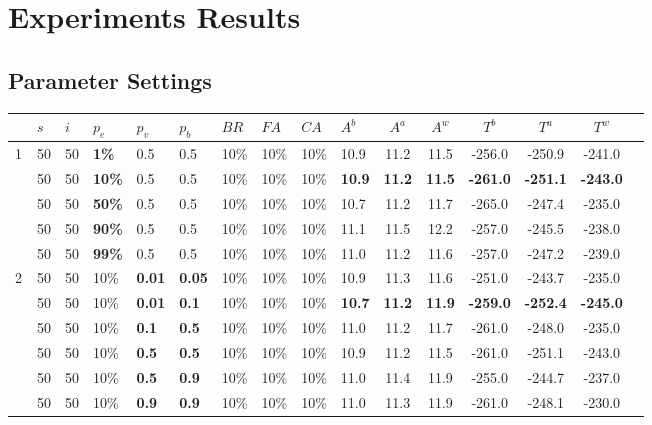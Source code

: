 \chapter{Experiments Results}
\label{appendixC}

\section{Parameter Settings}
\begin{sidewaystable}
    \centering
	\begin{tabular}{|l|l|l|l|l|l|l|l|l|l||c|c|c|c|c|c|}
 	\hline
    ~ & $s$ & $i$ & $p_{e}$ & $p_{v}$ & $p_{b}$ & $BR$ & $FA$ & $CA$ & $A^b$ & $A^a$ & $A^w$ & $T^b$ & $T^a$ & $T^w$\\
    \hline
    1 & 50 & 50 & \textbf{1\%} & 0.5 & 0.5 & 10\% & 10\% & 10\% & 10.9 & 11.2 & 11.5 & -256.0 & -250.9 & -241.0  \\
    ~ & 50 & 50 & \textbf{10\%} & 0.5 & 0.5 & 10\% & 10\% & 10\% & \textbf{10.9} & \textbf{11.2} & \textbf{11.5} & \textbf{-261.0} & \textbf{-251.1} & \textbf{-243.0} \\
    ~ & 50 & 50 & \textbf{50\%} & 0.5 & 0.5 & 10\% & 10\% & 10\% & 10.7 & 11.2 & 11.7 & -265.0 & -247.4 & -235.0  \\
    ~ & 50 & 50 & \textbf{90\%} & 0.5 & 0.5 & 10\% & 10\% & 10\% & 11.1 & 11.5 & 12.2 & -257.0 & -245.5 & -238.0  \\
    ~ & 50 & 50 & \textbf{99\%} & 0.5 & 0.5 & 10\% & 10\% & 10\% & 11.0 & 11.2 & 11.6 & -257.0 & -247.2 & -239.0  \\
    \hline
    2 & 50 & 50 & 10\% & \textbf{0.01} & \textbf{0.05} & 10\% & 10\% & 10\% & 10.9 & 11.3 & 11.6 & -251.0 & -243.7 & -235.0 \\
    ~ & 50 & 50 & 10\% & \textbf{0.01} & \textbf{0.1} & 10\% & 10\% & 10\% & \textbf{10.7} & \textbf{11.2} & \textbf{11.9} & \textbf{-259.0} & \textbf{-252.4} & \textbf{-245.0} \\
    ~ & 50 & 50 & 10\% & \textbf{0.1} & \textbf{0.5} & 10\% & 10\% & 10\% & 11.0 & 11.2 & 11.7 & -261.0 & -248.0 & -235.0 \\
    ~ & 50 & 50 & 10\% & \textbf{0.5} & \textbf{0.5} & 10\% & 10\% & 10\% & 10.9 & 11.2 & 11.5 & -261.0 & -251.1 & -243.0 \\
    ~ & 50 & 50 & 10\% & \textbf{0.5} & \textbf{0.9} & 10\% & 10\% & 10\% & 11.0 & 11.4 & 11.9 & -255.0 & -244.7 & -237.0 \\
    ~ & 50 & 50 & 10\% & \textbf{0.9} & \textbf{0.9} & 10\% & 10\% & 10\% & 11.0 & 11.3 & 11.9 & -261.0 & -248.1 & -230.0 \\

\end{tabular}
\end{sidewaystable}
